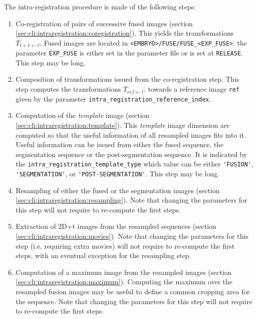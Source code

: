 The intra-registration procedure is made of the following steps:
\begin{enumerate}
\itemsep -1ex
\item \label{it:intrareg:co:register} Co-registration of pairs of successive fused images (section
  \ref{sec:cli:intraregistration:coregistration}). This yields the
  transformations $T_{t+1 \leftarrow t}$. Fused images are located in
  \verb|<EMBRYO>/FUSE/FUSE_<EXP_FUSE>|: the parameter \verb|EXP_FUSE|
  is either set in the parameter file or is set at
  \verb|RELEASE|. This step may be long. 

\item Composition of transformations issued from the co-registration
  step. This step computes the transformations $T_{ref \leftarrow
    t}$. towards a reference image \verb|ref| given by the parameter
  \verb|intra_registration_reference_index|. 

\item \label{it:intrareg:co:template} Computation of the \textit{template} image (section
  \ref{sec:cli:intraregistration:template}). This \textit{template}
  image dimension are computed so that the useful information of all
  resampled images fits into it. Useful information can be issued from
  either the fused sequence, the segmentation sequence or the
  post-segmentation sequence. It is indicated by the
  \verb|intra_registration_template_type| which value can be either
  \verb|'FUSION'|,  \verb|'SEGMENTATION'|, or
  \verb|'POST-SEGMENTATION'|. This step may be long. 

\item \label{it:intrareg:co:resampling}
  Resampling of either the fused or the segmentation images
  (section \ref{sec:cli:intraregistration:resampling}). Note that
  changing the parameters for this step will not require to re-compute
  the first steps. 

\item \label{it:intrareg:co:movies}
  Extraction of 2D+t images from the resampled sequences (section
  \ref{sec:cli:intraregistration:movies}). Note that changing the
  parameters for this step (i.e. requiring extra movies) will not
  require to re-compute the first steps, with an eventual exception
  for the resampling step. 

\item \label{it:intrareg:co:maximum}
  Computation of a maximum image from the resampled images (section
  \ref{sec:cli:intraregistration:maximum}). Computing the maximum over  
  the resampled fusion images may be useful to define a common cropping
  area for the sequence.
  Note that changing the parameters for this step will not require 
  to re-compute the first steps. 

\end{enumerate}



